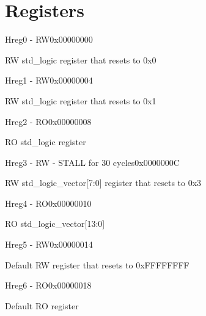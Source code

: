 \documentclass{article}
\begin{document}
\section{Registers}

\begin{register}{H}{reg0 - RW}{0x00000000}  \par RW std{\_}logic register that resets to 0x0 \regnewline
  \label{reg0}
\regnewline
\end{register}

\begin{register}{H}{reg1 - RW}{0x00000004}  \par RW std{\_}logic register that resets to 0x1 \regnewline
  \label{reg1}
\regnewline
\end{register}

\begin{register}{H}{reg2 - RO}{0x00000008}  \par RO std{\_}logic register \regnewline
  \label{reg2}
\regnewline
\end{register}

\begin{register}{H}{reg3 - RW - STALL for 30 cycles}{0x0000000C}  \par RW std{\_}logic{\_}vector[7:0] register that resets to 0x3 \regnewline
  \label{reg3}
\regnewline
\end{register}

\begin{register}{H}{reg4 - RO}{0x00000010}  \par RO std{\_}logic{\_}vector[13:0] \regnewline
  \label{reg4}
\regnewline
\end{register}

\begin{register}{H}{reg5 - RW}{0x00000014}  \par Default RW register that resets to 0xFFFFFFFF \regnewline
  \label{reg5}
\regnewline
\end{register}

\begin{register}{H}{reg6 - RO}{0x00000018}  \par Default RO register \regnewline
  \label{reg6}
\regnewline
\end{register}
\end{document}
